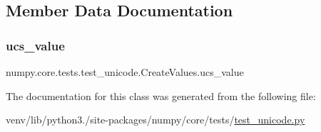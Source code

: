 \subsection{Member Data Documentation}
\mbox{\label{classnumpy_1_1core_1_1tests_1_1test__unicode_1_1CreateValues_aadbb7a82d97fac51814de79e2707d729}} 
\subsubsection{\texorpdfstring{ucs\+\_\+value}{ucs\_value}}
{\footnotesize\ttfamily numpy.\+core.\+tests.\+test\+\_\+unicode.\+Create\+Values.\+ucs\+\_\+value}



The documentation for this class was generated from the following file\+:\begin{DoxyCompactItemize}
\item 
venv/lib/python3./site-\/packages/numpy/core/tests/\hyperlink{test__unicode_8py}{test\+\_\+unicode.\+py}\end{DoxyCompactItemize}
